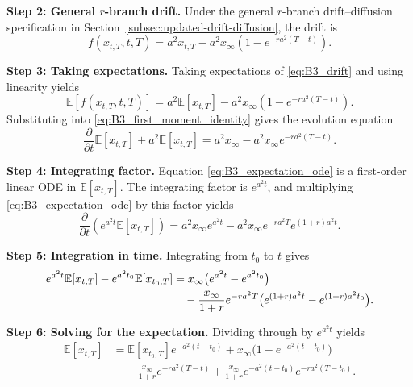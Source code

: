 \documentclass[12pt]{article}
\theoremstyle{statementstyle}
\begin{document}
\begin{appendices}
\medskip
\noindent\textbf{Step 2: General \(r\)-branch drift.}
Under the general \(r\)-branch drift--diffusion specification in
Section~\ref{subsec:updated-drift-diffusion}, the drift is
\begin{equation}
f(x_{t,T},t,T)
=
a^{2}x_{t,T}
-
a^{2}x_{\infty}\!\left(1-e^{-ra^{2}(T-t)}\right).
\label{eq:B3_drift}
\tag{B.3.2}
\end{equation}

\medskip
\noindent\textbf{Step 3: Taking expectations.}
Taking expectations of \eqref{eq:B3_drift} and using linearity yields
\[
\mathbb{E}[f(x_{t,T},t,T)]
=
a^{2}\mathbb{E}[x_{t,T}]
-
a^{2}x_{\infty}\!\left(1-e^{-ra^{2}(T-t)}\right).
\]
Substituting into \eqref{eq:B3_first_moment_identity} gives the evolution equation
\begin{equation}
\frac{\partial}{\partial t}\mathbb{E}[x_{t,T}]
+
a^{2}\mathbb{E}[x_{t,T}]
=
a^{2}x_{\infty}
-
a^{2}x_{\infty}e^{-ra^{2}(T-t)}.
\label{eq:B3_expectation_ode}
\tag{B.3.3}
\end{equation}

\medskip
\noindent\textbf{Step 4: Integrating factor.}
Equation \eqref{eq:B3_expectation_ode} is a first-order linear ODE in
\(\mathbb{E}[x_{t,T}]\). The integrating factor is \(e^{a^{2}t}\), and multiplying
\eqref{eq:B3_expectation_ode} by this factor yields
\[
\frac{\partial}{\partial t}
\left(e^{a^{2}t}\mathbb{E}[x_{t,T}]\right)
=
a^{2}x_{\infty}e^{a^{2}t}
-
a^{2}x_{\infty}e^{-ra^{2}T}e^{(1+r)a^{2}t}.
\]

\medskip
\noindent\textbf{Step 5: Integration in time.}
Integrating from \(t_0\) to \(t\) gives
\begin{align}
e^{a^{2}t}\mathbb{E}[x_{t,T}]
-
e^{a^{2}t_0}\mathbb{E}[x_{t_0,T}]
&=
x_{\infty}\bigl(e^{a^{2}t}-e^{a^{2}t_0}\bigr)
\nonumber\\
&\quad
-
\frac{x_{\infty}}{1+r}e^{-ra^{2}T}
\bigl(e^{(1+r)a^{2}t}-e^{(1+r)a^{2}t_0}\bigr).
\notag
\end{align}

\medskip
\noindent\textbf{Step 6: Solving for the expectation.}
Dividing through by \(e^{a^{2}t}\) yields
\begin{align}
\mathbb{E}[x_{t,T}]
&=
\mathbb{E}[x_{t_0,T}]e^{-a^{2}(t-t_0)}
+
x_{\infty}\bigl(1-e^{-a^{2}(t-t_0)}\bigr)
\nonumber\\
&\quad
-
\frac{x_{\infty}}{1+r}e^{-ra^{2}(T-t)}
+
\frac{x_{\infty}}{1+r}e^{-a^{2}(t-t_0)}e^{-ra^{2}(T-t_0)}.
\label{eq:B3_pre_final}
\tag{B.3.4}
\end{align}


\end{appendices}
\end{document}
